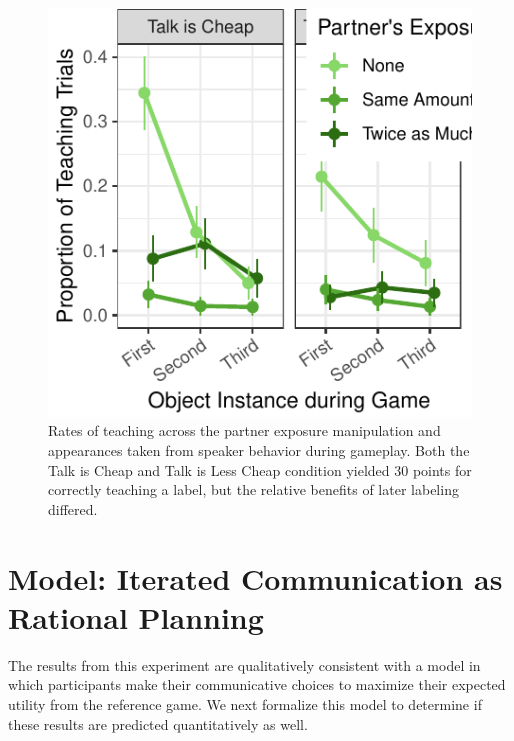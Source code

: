 \documentclass[10pt, letterpaper]{article}
\newenvironment{CodeChunk}{}{}
\begin{document}
\begin{CodeChunk}
\begin{figure}[H]

{\centering \includegraphics{figs/imp_teach-1} 

}

\caption[Rates of teaching across the partner exposure manipulation and appearances taken from speaker behavior during gameplay]{Rates of teaching across the partner exposure manipulation and appearances taken from speaker behavior during gameplay. Both the Talk is Cheap and Talk is Less Cheap condition yielded 30 points for correctly teaching a label, but the relative benefits of later labeling differed.}\label{fig:imp_teach}
\end{figure}
\end{CodeChunk}

\hypertarget{model-iterated-communication-as-rational-planning}{%
\section{Model: Iterated Communication as Rational
Planning}\label{model-iterated-communication-as-rational-planning}}

The results from this experiment are qualitatively consistent with a
model in which participants make their communicative choices to maximize
their expected utility from the reference game. We next formalize this
model to determine if these results are predicted quantitatively as
well.
\end{document}
